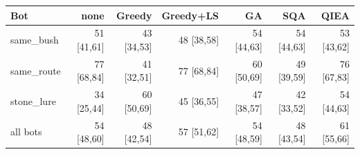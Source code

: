 \begin{tabular}{lrrrrrr}
\toprule
Bot & none & Greedy & Greedy+LS & GA & SQA & QIEA \\
\midrule
same\_bush & 51 {\scriptsize[41,61]} & 43 {\scriptsize[34,53]} & 48 {\scriptsize[38,58]} & 54 {\scriptsize[44,63]} & 54 {\scriptsize[44,63]} & 53 {\scriptsize[43,62]} \\
same\_route & 77 {\scriptsize[68,84]} & 41 {\scriptsize[32,51]} & 77 {\scriptsize[68,84]} & 60 {\scriptsize[50,69]} & 49 {\scriptsize[39,59]} & 76 {\scriptsize[67,83]} \\
stone\_lure & 34 {\scriptsize[25,44]} & 60 {\scriptsize[50,69]} & 45 {\scriptsize[36,55]} & 47 {\scriptsize[38,57]} & 42 {\scriptsize[33,52]} & 54 {\scriptsize[44,63]} \\
\midrule
all bots & 54 {\scriptsize[48,60]} & 48 {\scriptsize[42,54]} & 57 {\scriptsize[51,62]} & 54 {\scriptsize[48,59]} & 48 {\scriptsize[43,54]} & 61 {\scriptsize[55,66]} \\
\bottomrule
\end{tabular}
